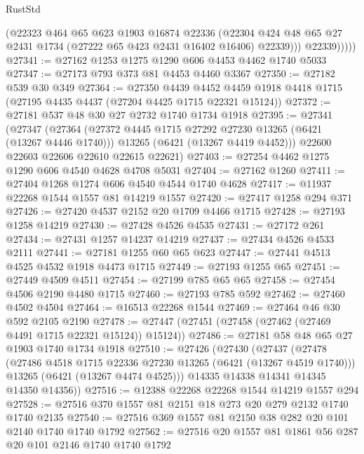 \begin{lexlean}{RustStd}
\begin{coremodule}
                (@22323
                  @464
                  @65
                  @623
                  @1903
                  @16874
                  @22336
                  (@22304
                    @424
                    @48
                    @65
                    @27
                    @2431
                    @1734
                    (@27222 @65 @423 @2431 @16402 @16406)
                    @22339)))
              @22339)))))
@27341 := @27162 @1253 @1275 @1290 @606 @4453 @4462 @1740 @5033
@27347 := @27173 @793 @373 @81 @4453 @4460 @3367
@27350 := @27182 @539 @30 @349
@27364 := @27350
    @4439
    @4452
    @4459
    @1918
    @4418
    @1715
    (@27195 @4435 @4437 (@27204 @4425 @1715 @22321 @15124))
@27372 := @27181 @537 @48 @30 @27 @2732 @1740 @1734 @1918
@27395 := @27341
    (@27347
      (@27364
        (@27372 @4445 @1715 @27292 @27230 @13265 (@6421 (@13267 @4446 @1740)))
        @13265
        (@6421 (@13267 @4419 @4452)))
      @22600
      @22603
      @22606
      @22610
      @22615
      @22621)
@27403 := @27254 @4462 @1275 @1290 @606 @4540 @4628 @4708 @5031
@27404 := @27162 @1260
@27411 := @27404 @1268 @1274 @606 @4540 @4544 @1740 @4628
@27417 := @11937 @22268 @1544 @1557 @81 @14219 @1557
@27420 := @27417 @1258 @294 @371
@27426 := @27420 @4537 @2152 @20 @1709 @4466 @1715
@27428 := @27193 @1258 @14219
@27430 := @27428 @4526 @4535
@27431 := @27172 @261
@27434 := @27431 @1257 @14237 @14219
@27437 := @27434 @4526 @4533 @2111
@27441 := @27181 @1255 @60 @65 @623
@27447 := @27441 @4513 @4525 @4532 @1918 @4473 @1715
@27449 := @27193 @1255 @65
@27451 := @27449 @4509 @4511
@27454 := @27199 @785 @65 @65
@27458 := @27454 @4506 @2190 @4480 @1715
@27460 := @27193 @785 @592
@27462 := @27460 @4502 @4504
@27464 := @16513 @22268 @1544
@27469 := @27464 @46 @30 @592 @2105 @2190
@27478 := @27447 (@27451 (@27458 (@27462 (@27469 @4491 @1715 @22321 @15124)) @15124))
@27486 := @27181 @58 @48 @65 @27 @1903 @1740 @1734 @1918
@27510 := @27426
    (@27430
      (@27437
        (@27478
          (@27486 @4518 @1715 @22336 @27230 @13265 (@6421 (@13267 @4519 @1740)))
          @13265
          (@6421 (@13267 @4474 @4525)))
        @14335
        @14338
        @14341
        @14345
        @14350
        @14356))
@27516 := @12388 @22268 @22268 @1544 @14219 @1557 @294
@27528 := @27516 @370 @1557 @81 @2151 @18 @273 @20 @279 @2132 @1740 @1740 @2135
@27540 := @27516 @369 @1557 @81 @2150 @38 @282 @20 @101 @2140 @1740 @1740 @1792
@27562 := @27516
    @20
    @1557
    @81
    @1861
    @56
    @287
    @20
    @101
    @2146
    @1740
    @1740
    @1792

\end{coremodule}
\end{lexlean}
